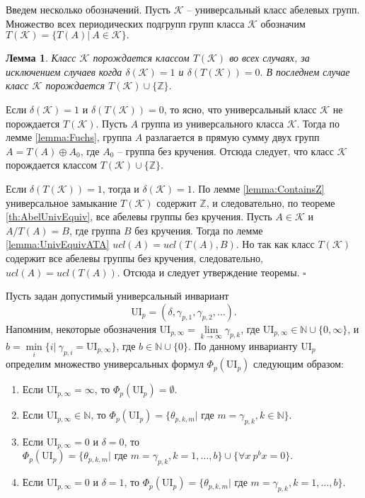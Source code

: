 \documentclass[a4paper,11pt,twoside]{article}
\newtheorem{lemma}{Лемма}[section]
\def\proof{{\noindent{\bf Доказательство.}} }
\def\K{{\mathcal{K}}}
\def\Z{{\mathbb{Z}}}
\def\N{{\mathbb{N}}}
\def\ui{{\mathrm{UI}}}
\begin{document}
Введем несколько обозначений. Пусть $\K$ -- универсальный класс абелевых групп. Множество всех периодических подгрупп групп класса $\K$ обозначим $T(\K) = \{ T(A) | \ A \in \K\}.$

\begin{lemma}\label{lemma:ClassKGeneratedByTK}
Класс $\K$ порождается классом $T(\K)$ во всех случаях, за исключением случаев когда $\delta(\K) = 1$ и $\delta(T(\K)) = 0.$ В последнем случае класс $\K$ порождается $T(\K) \cup \{\Z\}.$ 
\end{lemma}

\proof Если $\delta(\K) = 1$ и $\delta(T(\K)) = 0$, то ясно, что универсальный класс $\K$ не порождается $T(\K)$. Пусть $A$ группа из универсального класса $\K$. Тогда по лемме \ref{lemma:Fuchs}, группа $A$ разлагается в прямую сумму двух групп $A = T(A) \oplus A_0$, где $A_0$ -- группа без кручения. Отсюда следует, что класс $\K$ порождается классом $T(\K) \cup \{\Z\}.$

Если $\delta(T(\K)) = 1$, тогда и $\delta(\K) = 1$. По лемме \ref{lemma:ContainsZ} универсальное замыкание $T(\K)$ содержит $\Z$, и следовательно, по теореме \ref{th:AbelUnivEquiv}, все абелевы группы без кручения. Пусть $A \in \K$ и $A \big/ T(A) = B$, где группа $B$ без кручения. Тогда по лемме \ref{lemma:UnivEquivATA} $ucl(A) = ucl(T(A), B).$ Но так как класс $T(\K)$ содержит все абелевы группы без кручения, следовательно, $ucl(A) = ucl(T(A))$. Отсюда и следует утверждение теоремы. $\square$


Пусть задан допустимый универсальный инвариант 
$$\ui_p = (\delta, \gamma_{p,1}, \gamma_{p,2}, \ldots).$$ 
Напомним, некоторые обозначения $\ui_{p,\infty} = \lim\limits_{k \rightarrow \infty} \gamma_{p,k}$, где $\ui_{p,\infty} \in \N \cup \{0, \infty\}$, и $b = \min\limits_{i}\{i | \ \gamma_{p,i} = \ui_{p, \infty}\}$, где $b \in \N \cup \{0\}$. По данному инварианту $\ui_p$ определим множество универсальных формул $\Phi_p(\ui_p)$ следующим образом:
\begin{enumerate}
\item Если $\ui_{p,\infty} = \infty$, то $\Phi_p(\ui_p) = \emptyset.$
\item Если $\ui_{p, \infty} \in \N$, то $\Phi_p(\ui_p) = \{\theta_{p,k,m} | \text{ где } m = \gamma_{p,k}, k \in \N\}.$
\item Если $\ui_{p, \infty} = 0$ и $\delta = 0$, то $\Phi_p(\ui_p) = \{\theta_{p,k,m} | \text{ где } m = \gamma_{p,k}, k = 1,\ldots,b\} \cup \{\forall x \ p^b x = 0\}.$
\item Если $\ui_{p, \infty} = 0$ и $\delta = 1$, то $\Phi_p(\ui_p) = \{\theta_{p,k,m} | \text{ где } m = \gamma_{p,k}, k = 1, \ldots, b\}.$
\end{enumerate}
\end{document}
